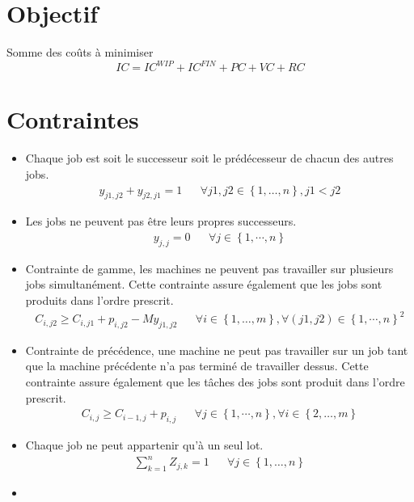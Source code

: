 \documentclass{article}
\begin{document}
\section*{Objectif}
Somme des coûts à minimiser
$$IC=IC^{WIP}+IC^{FIN}+PC+VC+RC$$


\section*{Contraintes}

\begin{itemize}
	\item
	      Chaque job est soit le successeur soit le prédécesseur de chacun des autres jobs.
	      \begin{align}
		      y_{j1,j2}+y_{j2,j1}=1 &  &
		      \forall j1,j2\in\left\{1,\dotsc,n\right\}, j1<j2
	      \end{align}
	\item
	      Les jobs ne peuvent pas être leurs propres successeurs.
	      \begin{align}
		      y_{j,j}=0 &  &
		      \forall j\in \left\{1,\cdots, n\right\}
	      \end{align}
	\item
	      Contrainte de gamme, les machines ne peuvent pas travailler sur plusieurs jobs simultanément.
	      Cette contrainte assure également que les jobs sont produits dans l'ordre prescrit.
	      \begin{align}
		      C_{i,j2} \geq C_{i,j1}+p_{i,j2}-M y_{j1,j2} &  &
		      \forall i\in\left\{1,\dotsc,m\right\}, \forall\left(j1,j2\right)\in\left\{1,\cdots,n\right\}^2
	      \end{align}
	\item
	      Contrainte de précédence, une machine ne peut pas travailler sur un job tant que la machine précédente n’a pas terminé de travailler dessus.
	      Cette contrainte assure également que les tâches des jobs sont produit dans l'ordre prescrit.
	      \begin{align}
		      C_{i,j}\geq C_{i-1,j}+p_{i,j} &  &
		      \forall j\in\left\{1,\cdots,n\right\},\forall i\in\left\{2,\dotsc,m\right\}
	      \end{align}
	\item
	      Chaque job ne peut appartenir qu’à un seul lot.
	      \begin{align}
		      \sum_{k=1}^{n}Z_{j,k}=1 &  &
		      \forall j \in\left\{1,\dotsc,n \right\}
	      \end{align}
	\item

\end{itemize}
\end{document}
